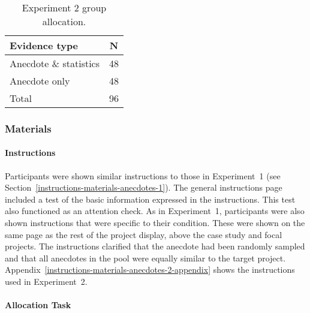 \documentclass[a4paper, nobind]{templates/ociamthesis}
\theoremstyle{definition}
\theoremstyle{definition}
\theoremstyle{definition}
\theoremstyle{definition}
\theoremstyle{remark}
\begin{document}
\begin{table}[tbp]

\begin{center}
\begin{threeparttable}

\caption{\label{tab:condition-allocation-anecdotes-2}Experiment 2 group allocation.}

\begin{tabular}{ll}
\toprule
Evidence type & \multicolumn{1}{c}{N}\\
\midrule
Anecdote \& statistics & 48\\
Anecdote only & 48\\
Total & 96\\
\bottomrule
\end{tabular}

\end{threeparttable}
\end{center}

\end{table}

\subsubsection{Materials}

\paragraph{Instructions}

Participants were shown similar instructions to those in Experiment~1 (see
Section~\ref{instructions-materials-anecdotes-1}). The general instructions
page included a test of the basic information expressed in the instructions.
This test also functioned as an attention check. As in Experiment~1,
participants were also shown instructions that were specific to their condition.
These were shown on the same page as the rest of the project display, above the
case study and focal projects. The instructions clarified that the anecdote had
been randomly sampled and that all anecdotes in the pool were equally similar to
the target project. Appendix~\ref{instructions-materials-anecdotes-2-appendix}
shows the instructions used in Experiment~2.

\hypertarget{allocation-anecdotes-2}{%
\paragraph{Allocation Task}\label{allocation-anecdotes-2}}
\end{document}
